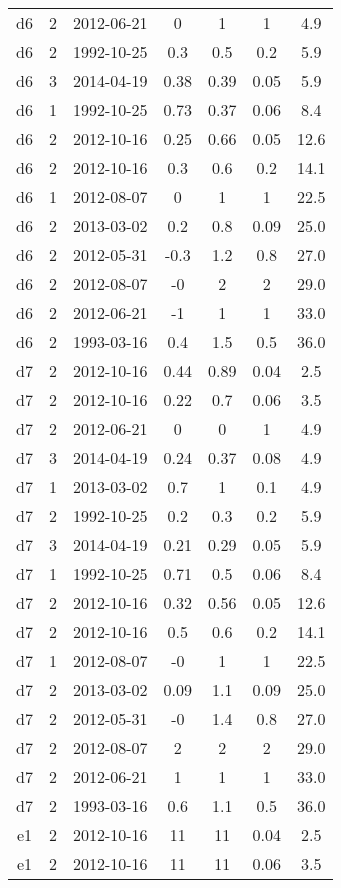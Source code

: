 \begin{table*}[htp]
\begin{tabular}{ccccccc}
d6 & 2 & 2012-06-21 & 0 & 1 & 1 & 4.9 \\
d6 & 2 & 1992-10-25 & 0.3 & 0.5 & 0.2 & 5.9 \\
d6 & 3 & 2014-04-19 & 0.38 & 0.39 & 0.05 & 5.9 \\
d6 & 1 & 1992-10-25 & 0.73 & 0.37 & 0.06 & 8.4 \\
d6 & 2 & 2012-10-16 & 0.25 & 0.66 & 0.05 & 12.6 \\
d6 & 2 & 2012-10-16 & 0.3 & 0.6 & 0.2 & 14.1 \\
d6 & 1 & 2012-08-07 & 0 & 1 & 1 & 22.5 \\
d6 & 2 & 2013-03-02 & 0.2 & 0.8 & 0.09 & 25.0 \\
d6 & 2 & 2012-05-31 & -0.3 & 1.2 & 0.8 & 27.0 \\
d6 & 2 & 2012-08-07 & -0 & 2 & 2 & 29.0 \\
d6 & 2 & 2012-06-21 & -1 & 1 & 1 & 33.0 \\
d6 & 2 & 1993-03-16 & 0.4 & 1.5 & 0.5 & 36.0 \\
d7 & 2 & 2012-10-16 & 0.44 & 0.89 & 0.04 & 2.5 \\
d7 & 2 & 2012-10-16 & 0.22 & 0.7 & 0.06 & 3.5 \\
d7 & 2 & 2012-06-21 & 0 & 0 & 1 & 4.9 \\
d7 & 3 & 2014-04-19 & 0.24 & 0.37 & 0.08 & 4.9 \\
d7 & 1 & 2013-03-02 & 0.7 & 1 & 0.1 & 4.9 \\
d7 & 2 & 1992-10-25 & 0.2 & 0.3 & 0.2 & 5.9 \\
d7 & 3 & 2014-04-19 & 0.21 & 0.29 & 0.05 & 5.9 \\
d7 & 1 & 1992-10-25 & 0.71 & 0.5 & 0.06 & 8.4 \\
d7 & 2 & 2012-10-16 & 0.32 & 0.56 & 0.05 & 12.6 \\
d7 & 2 & 2012-10-16 & 0.5 & 0.6 & 0.2 & 14.1 \\
d7 & 1 & 2012-08-07 & -0 & 1 & 1 & 22.5 \\
d7 & 2 & 2013-03-02 & 0.09 & 1.1 & 0.09 & 25.0 \\
d7 & 2 & 2012-05-31 & -0 & 1.4 & 0.8 & 27.0 \\
d7 & 2 & 2012-08-07 & 2 & 2 & 2 & 29.0 \\
d7 & 2 & 2012-06-21 & 1 & 1 & 1 & 33.0 \\
d7 & 2 & 1993-03-16 & 0.6 & 1.1 & 0.5 & 36.0 \\
e1 & 2 & 2012-10-16 & 11 & 11 & 0.04 & 2.5 \\
e1 & 2 & 2012-10-16 & 11 & 11 & 0.06 & 3.5 \\

\end{tabular}
\end{table*}
